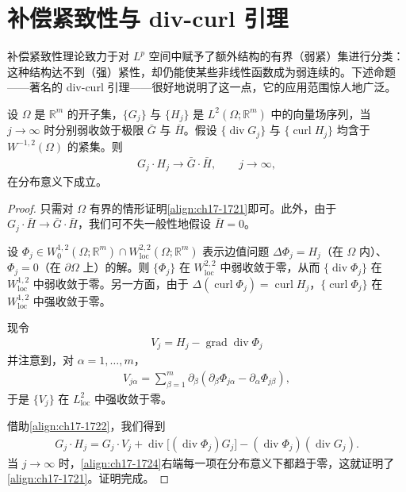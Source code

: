 \documentclass[../../main.tex]{subfiles}
\begin{document}
\section{补偿紧致性与 div-curl 引理}\label{section:ch17-补偿紧致与divcurl}

补偿紧致性理论致力于对 $L^p$ 空间中赋予了额外结构的有界（弱紧）集进行分类：这种结构达不到（强）紧性，却仍能使某些非线性函数成为弱连续的。下述命题——著名的 div-curl 引理——很好地说明了这一点，它的应用范围惊人地广泛。

\begin{theorem}\label{theorem:ch17-divcurl引理}
设 $\Omega$ 是 $\mathbb{R}^m$ 的开子集，$\{G_j\}$ 与 $\{H_j\}$ 是 $L^2(\Omega;\mathbb{R}^m)$ 中的向量场序列，当 $j\to\infty$ 时分别弱收敛于极限 $\bar G$ 与 $\bar H$。假设 $\{\operatorname{div}G_j\}$ 与 $\{\operatorname{curl}H_j\}$ 均含于 $W^{-1,2}(\Omega)$ 的紧集。则
\begin{align}
G_j\cdot H_j\longrightarrow\bar G\cdot\bar H,\qquad j\to\infty,
\label{align:ch17-1721}
\end{align}
在分布意义下成立。
\end{theorem}

\begin{proof}
只需对 $\Omega$ 有界的情形证明\eqref{align:ch17-1721}即可。此外，由于 $G_j\cdot\bar H\to\bar G\cdot\bar H$，我们可不失一般性地假设 $\bar H=0$。

设 $\Phi_j\in W^{1,2}_0(\Omega;\mathbb{R}^m)\cap W^{2,2}_{\mathrm{loc}}(\Omega;\mathbb{R}^m)$ 表示边值问题 $\Delta\Phi_j=H_j$（在 $\Omega$ 内）、$\Phi_j=0$（在 $\partial\Omega$ 上）的解。则 $\{\Phi_j\}$ 在 $W^{2,2}_{\mathrm{loc}}$ 中弱收敛于零，从而 $\{\operatorname{div}\Phi_j\}$ 在 $W^{1,2}_{\mathrm{loc}}$ 中弱收敛于零。另一方面，由于 $\Delta(\operatorname{curl}\Phi_j)=\operatorname{curl}H_j$，$\{\operatorname{curl}\Phi_j\}$ 在 $W^{1,2}_{\mathrm{loc}}$ 中强收敛于零。

现令
\begin{align}
V_j=H_j-\operatorname{grad}\operatorname{div}\Phi_j
\label{align:ch17-1722}
\end{align}
并注意到，对 $\alpha=1,\ldots,m$，
\begin{align}
V_{j\alpha}=\sum_{\beta=1}^{m}\partial_\beta(\partial_\beta\Phi_{j\alpha}-\partial_\alpha\Phi_{j\beta}),
\label{align:ch17-1723}
\end{align}
于是 $\{V_j\}$ 在 $L^2_{\mathrm{loc}}$ 中强收敛于零。

借助\eqref{align:ch17-1722}，我们得到
\begin{align}
G_j\cdot H_j=G_j\cdot V_j+\operatorname{div}\bigl[(\operatorname{div}\Phi_j)G_j\bigr]-(\operatorname{div}\Phi_j)(\operatorname{div}G_j).
\label{align:ch17-1724}
\end{align}
当 $j\to\infty$ 时，\eqref{align:ch17-1724}右端每一项在分布意义下都趋于零，这就证明了\eqref{align:ch17-1721}。证明完成。
\end{proof}
\end{document}

